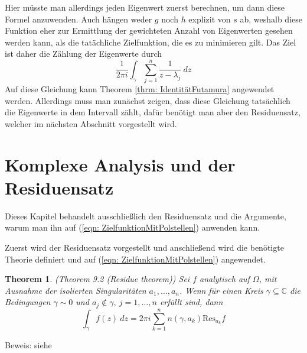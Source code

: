 \documentclass[a4paper,12pt]{report}
\newcommand{\C}{\mathbb C}
\newcommand{\1}{\mathds{1}}
\newcommand{\Res}{\text{Res}}
\theoremstyle{plain} %
\newtheorem{theorem}{Theorem}
\theoremstyle{definition} %
\theoremstyle{remark}
\begin{document}
            Hier müsste man allerdings jeden Eigenwert zuerst berechnen, um dann diese Formel anzuwenden.
            Auch hängen weder $g$ noch $h$ explizit von $s$ ab, weshalb diese Funktion eher zur Ermittlung der gewichteten Anzahl von Eigenwerten gesehen werden kann, als die tatächliche Zielfunktion, die es zu minimieren gilt.
            Das Ziel ist daher die Zählung der Eigenwerte durch
            \begin{equation}
                  \label{eqn: ZielfunktionMitPolstellen}
                  \frac 1 {2\pi i}\int_\gamma \sum_{j=1}^{n} \frac{1}{z-\lambda_j}\ dz
            \end{equation}
            Auf diese Gleichung kann Theorem \ref{thrm: IdentitätFutamura} angewendet werden.
            Allerdings muss man zunächst zeigen, dass diese Gleichung tatsächlich die Eigenwerte in dem Intervall zählt, dafür benötigt man aber den Residuensatz, welcher im nächsten Abschnitt vorgestellt wird.
      \section{Komplexe Analysis und der Residuensatz}
            Dieses Kapitel behandelt ausschließlich den Residuensatz und die Argumente, warum man ihn auf (\ref{eqn: ZielfunktionMitPolstellen}) anwenden kann.
            
            Zuerst wird der Residuensatz vorgestellt und anschließend wird die benötigte Theorie definiert und auf (\ref{eqn: ZielfunktionMitPolstellen}) angewendet.

            \begin{theorem}(Theorem 9.2 (Residue theorem)\cite[S. 141]{complexAnalysis})
                  \label{thrm: Residuensatz}
                  Sei $f$ analytisch auf $\Omega$, mit Ausnahme der isolierten Singularitäten $a_1,\dots,a_n$. Wenn für einen Kreis $\gamma\subseteq\C$ die Bedingungen $\gamma \sim 0$ und $a_j\notin \gamma,\ j=1,\dots,n$ erfüllt sind, dann
                  $$\int_\gamma f(z)\ dz = 2\pi i\sum_{k=1}^{n} n(\gamma, a_k)\Res_{a_k}f$$
            \end{theorem}
            Beweis: siehe \cite[S. 142]{complexAnalysis}
\end{document}
